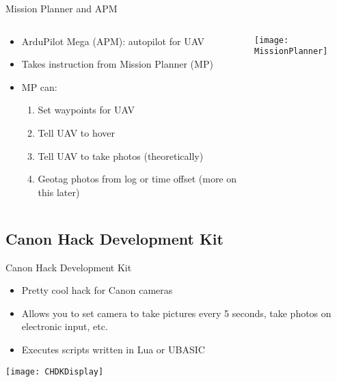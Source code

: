 \documentclass[table]{beamer}
\begin{document}
\begin{frame}{Mission Planner and APM}
    \begin{columns}[T]
        \begin{column}[T]{5cm}
            \begin{itemize}
                \item ArduPilot Mega (APM): autopilot for UAV
                \item Takes instruction from Mission Planner (MP)
                \item MP can:
                    \begin{enumerate}
                        \item Set waypoints for UAV
                        \item Tell UAV to hover
                        \item Tell UAV to take photos (theoretically)
                        \item Geotag photos from log or time offset (more on
                            this later)
                    \end{enumerate}
            \end{itemize}
        \end{column}
        \begin{column}[T]{7cm}
            \begin{center}
                \texttt{[image: MissionPlanner]}
            \end{center}
        \end{column}
    \end{columns}
\end{frame}

\subsection{Canon Hack Development Kit}

\begin{frame}{Canon Hack Development Kit}
    \begin{itemize}
        \item Pretty cool hack for Canon cameras
        \item Allows you to set camera to take pictures every 5 seconds, take
            photos on electronic input, etc.
        \item Executes scripts written in Lua or UBASIC
    \end{itemize}
    \begin{center}
        \texttt{[image: CHDKDisplay]}
    \end{center}
\end{frame}
\end{document}

